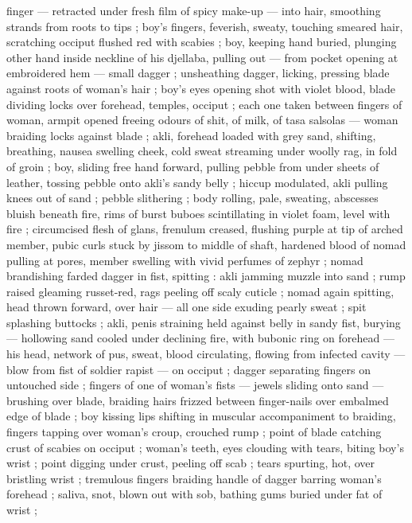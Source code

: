 finger --- retracted under fresh film of spicy make-up --- into hair, 
smoothing strands from roots to tips ; boy's fingers, feverish, sweaty, 
touching smeared hair, scratching occiput flushed red with scabies ; 
boy, keeping hand buried, plunging other hand inside neckline of his 
djellaba, pulling out --- from pocket opening at embroidered hem --- 
small dagger ; unsheathing dagger, licking, pressing blade against 
roots of woman's hair ; boy's eyes opening shot with violet blood, 
blade dividing locks over forehead, temples, occiput ; each one taken 
between fingers of woman, armpit opened freeing odours of shit, of 
milk, of tasa salsolas --- woman braiding locks against blade ; akli, 
forehead loaded with grey sand, shifting, breathing, nausea swelling 
cheek, cold sweat streaming under woolly rag, in fold of groin ; boy, 
sliding free hand forward, pulling pebble from under sheets of 
leather, tossing pebble onto akli's sandy belly ; hiccup modulated, 
akli pulling knees out of sand ; pebble slithering ; body rolling, pale, 
sweating, abscesses bluish beneath fire, rims of burst buboes 
scintillating in violet foam, level with fire ; circumcised flesh of glans, 
frenulum creased, flushing purple at tip of arched member, pubic 
curls stuck by jissom to middle of shaft, hardened blood of nomad 
pulling at pores, member swelling with vivid perfumes of zephyr ; 
nomad brandishing farded dagger in fist, spitting : akli jamming 
muzzle into sand ; rump raised gleaming russet-red, rags peeling off 
scaly cuticle ; nomad again spitting, head thrown forward, over hair 
--- all one side exuding pearly sweat ; spit splashing buttocks ; akli, 
penis straining held against belly in sandy fist, burying --- hollowing 
sand cooled under declining fire, with bubonic ring on forehead --- 
his head, network of pus, sweat, blood circulating, flowing from 
infected cavity --- blow from fist of soldier rapist --- on occiput ; 
dagger separating fingers on untouched side ; fingers of one of 
woman's fists --- jewels sliding onto sand --- brushing over blade, 
braiding hairs frizzed between finger-nails over embalmed edge of 
blade ; boy kissing lips shifting in muscular accompaniment to 
braiding, fingers tapping over woman's croup, crouched rump ; point 
of blade catching crust of scabies on occiput ; woman's teeth, eyes 
clouding with tears, biting boy's wrist ; point digging under crust, 
peeling off scab ; tears spurting, hot, over bristling wrist ; tremulous 
fingers braiding handle of dagger barring woman's forehead ; saliva, 
snot, blown out with sob, bathing gums buried under fat of wrist ; 
